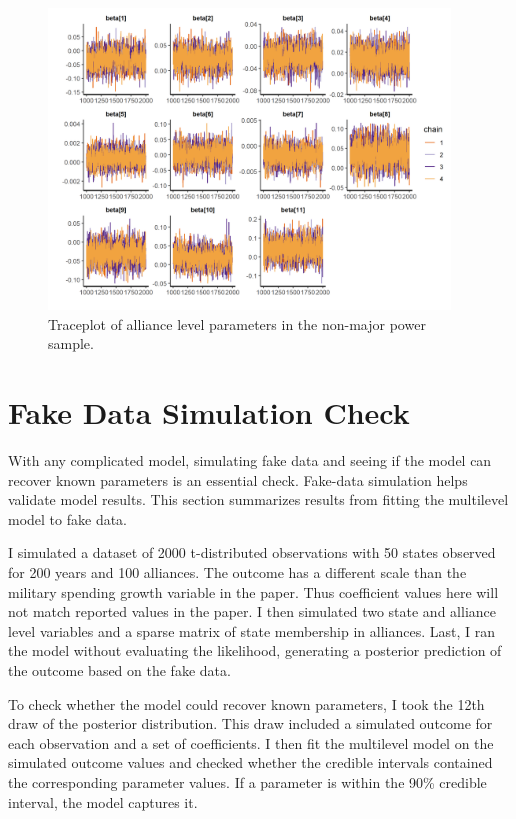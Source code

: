 \documentclass[12pt]{article}
\begin{document}
\begin{figure}[htbp]
	\centering
		\includegraphics[width=0.95\textwidth]{trace-all-min.png}
	\caption{Traceplot of alliance level parameters in the non-major power sample.}
	\label{fig:trace-all-min}
\end{figure}



\section{Fake Data Simulation Check}


With any complicated model, simulating fake data and seeing if the model can recover known parameters is an essential check. 
Fake-data simulation helps validate model results. 
This section summarizes results from fitting the multilevel model to fake data.


I simulated a dataset of 2000 t-distributed observations with 50 states observed for 200 years and 100 alliances. 
The outcome has a different scale than the military spending growth variable in the paper.
Thus coefficient values here will not match reported values in the paper.  
I then simulated two state and alliance level variables and a sparse matrix of state membership in alliances. 
Last, I ran the model without evaluating the likelihood, generating a posterior prediction of the outcome based on the fake data.


To check whether the model could recover known parameters, I took the 12th draw of the posterior distribution.
This draw included a simulated outcome for each observation and a set of coefficients. 
I then fit the multilevel model on the simulated outcome values and checked whether the credible intervals contained the corresponding parameter values. 
If a parameter is within the 90\% credible interval, the model captures it. 
\end{document}
